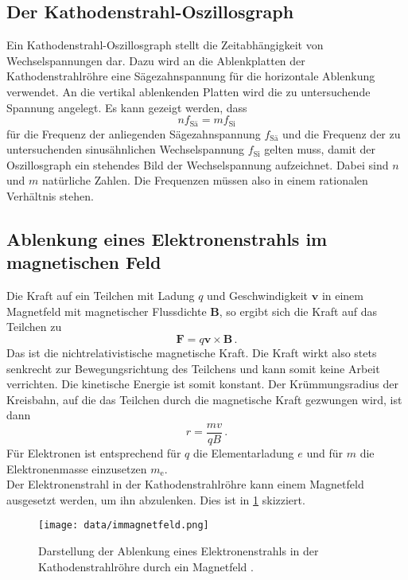 \subsection{Der Kathodenstrahl-Oszillosgraph}
\label{subsec:oszi}
Ein Kathodenstrahl-Oszillosgraph stellt die Zeitabhängigkeit von Wechselspannungen dar.
Dazu wird an die Ablenkplatten der Kathodenstrahlröhre eine Sägezahnspannung für die
horizontale Ablenkung verwendet. An die vertikal ablenkenden Platten wird die zu untersuchende
Spannung angelegt. Es kann gezeigt werden, dass
\begin{equation}
  n f_\text{Sä} = m f_\text{Si}
\end{equation}
für die Frequenz der anliegenden Sägezahnspannung $f_\text{Sä}$ und die Frequenz
der zu untersuchenden sinusähnlichen Wechselspannung $f_\text{Si}$ gelten muss, damit
der Oszillosgraph ein stehendes Bild der Wechselspannung aufzeichnet. Dabei sind
$n$ und $m$ natürliche Zahlen. Die Frequenzen müssen also in einem rationalen
Verhältnis stehen.

\subsection{Ablenkung eines Elektronenstrahls im magnetischen Feld}
\label{subsec:immagnetfeld}
Die Kraft auf ein Teilchen mit Ladung $q$ und Geschwindigkeit $\symbf{v}$ in einem
Magnetfeld mit magnetischer Flussdichte $\symbf{B}$, so ergibt sich die Kraft
auf das Teilchen zu
\begin{equation}
  \symbf{F} = q \symbf{v} \times \symbf{B}\,.
  \label{eqn:magkraft}
\end{equation}
Das ist die nichtrelativistische magnetische Kraft. Die Kraft wirkt also stets senkrecht
zur Bewegungsrichtung des Teilchens und kann somit keine Arbeit verrichten.
Die kinetische Energie ist somit konstant.
Der Krümmungsradius der Kreisbahn, auf die das Teilchen durch die magnetische Kraft gezwungen
wird, ist dann
\begin{equation}
  r = \frac{m v}{q B}\,.
  \label{eqn:kruemmung}
\end{equation}
Für Elektronen ist entsprechend für $q$ die Elementarladung $e$ und für $m$ die Elektronenmasse
einzusetzen $m_\text{e}$. \\
Der Elektronenstrahl in der Kathodenstrahlröhre kann einem Magnetfeld ausgesetzt werden,
um ihn abzulenken. Dies ist in \ref{fig:magnetkathode} skizziert.

\begin{figure}[H]
  \centering
  \texttt{[image: data/immagnetfeld.png]}
  \caption{Darstellung der Ablenkung eines Elektronenstrahls in der Kathodenstrahlröhre durch ein Magnetfeld \cite{Versuchsanleitung502}.}
  \label{fig:magnetkathode}
\end{figure}

